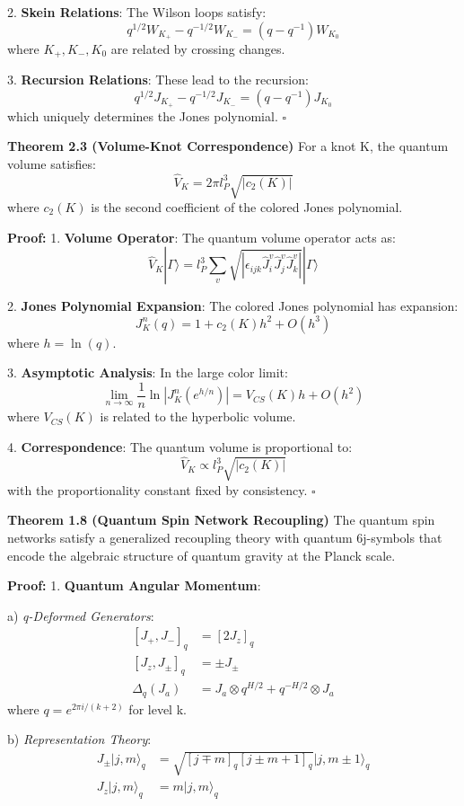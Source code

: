 \documentclass[12pt,a4paper]{article}
\begin{document}
2. \textbf{Skein Relations}:
   The Wilson loops satisfy:
   \[
   q^{1/2}W_{K_+} - q^{-1/2}W_{K_-} = (q-q^{-1})W_{K_0}
   \]
   where $K_+, K_-, K_0$ are related by crossing changes.

3. \textbf{Recursion Relations}:
   These lead to the recursion:
   \[
   q^{1/2}J_{K_+} - q^{-1/2}J_{K_-} = (q-q^{-1})J_{K_0}
   \]
   which uniquely determines the Jones polynomial. $\square$

\textbf{Theorem 2.3 (Volume-Knot Correspondence)}
For a knot K, the quantum volume satisfies:
\[
\hat{V}_K = 2\pi l_P^3 \sqrt{|c_2(K)|}
\]
where $c_2(K)$ is the second coefficient of the colored Jones polynomial.

\textbf{Proof:}
1. \textbf{Volume Operator}:
   The quantum volume operator acts as:
   \[
   \hat{V}_K|\Gamma\rangle = l_P^3\sum_v \sqrt{|\epsilon_{ijk}\hat{J}_i^v\hat{J}_j^v\hat{J}_k^v|}|\Gamma\rangle
   \]

2. \textbf{Jones Polynomial Expansion}:
   The colored Jones polynomial has expansion:
   \[
   J_K^n(q) = 1 + c_2(K)h^2 + O(h^3)
   \]
   where $h = \ln(q)$.

3. \textbf{Asymptotic Analysis}:
   In the large color limit:
   \[
   \lim_{n\to\infty} \frac{1}{n}\ln|J_K^n(e^{h/n})| = V_{CS}(K)h + O(h^2)
   \]
   where $V_{CS}(K)$ is related to the hyperbolic volume.

4. \textbf{Correspondence}:
   The quantum volume is proportional to:
   \[
   \hat{V}_K \propto l_P^3\sqrt{|c_2(K)|}
   \]
   with the proportionality constant fixed by consistency. $\square$

\textbf{Theorem 1.8 (Quantum Spin Network Recoupling)}
The quantum spin networks satisfy a generalized recoupling theory with quantum 6j-symbols that encode the algebraic structure of quantum gravity at the Planck scale.

\textbf{Proof:}
1. \textbf{Quantum Angular Momentum}:
   
   a) \textit{q-Deformed Generators}:
      \[
      \begin{aligned}
      [J_+, J_-]_q &= [2J_z]_q \\
      [J_z, J_{\pm}]_q &= \pm J_{\pm} \\
      \Delta_q(J_a) &= J_a \otimes q^{H/2} + q^{-H/2} \otimes J_a
      \end{aligned}
      \]
      where $q = e^{2\pi i/(k+2)}$ for level k.
   
   b) \textit{Representation Theory}:
      \[
      \begin{aligned}
      J_{\pm}|j,m\rangle_q &= \sqrt{[j \mp m]_q[j \pm m + 1]_q}|j,m \pm 1\rangle_q \\
      J_z|j,m\rangle_q &= m|j,m\rangle_q
      \end{aligned}
      \]
\end{document}
